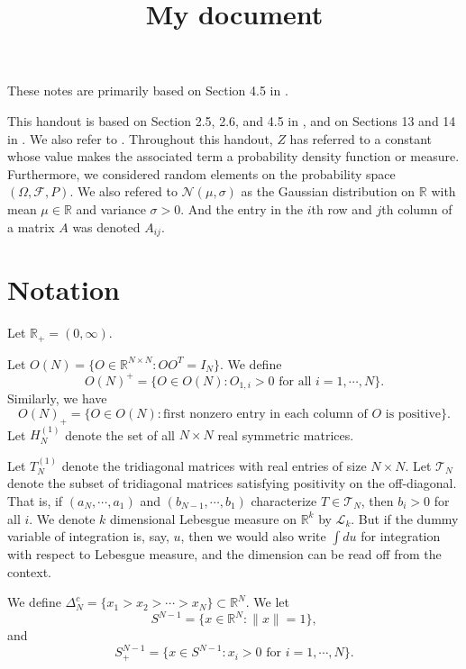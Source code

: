 \documentclass[
  twocolumn,
  landscape]{report}
\title{My document}
\author{}
\date{}
\theoremstyle{definition}
\theoremstyle{remark}
\newcommand{\R}{\mathbb{R}}
\renewcommand*\contentsname{Table of contents}
\newcommand\contentsname{Table of contents}
\begin{document}
\maketitle

\renewcommand*\contentsname{Table of contents}
{
\hypersetup{linkcolor=}
\setcounter{tocdepth}{2}
\tableofcontents
}
\listoffigures
\listoftables

These notes are primarily based on Section 4.5 in \cite{Anderson2010}.

This handout is based on Section 2.5, 2.6, and 4.5 in
\cite{Anderson2010}, and on Sections 13 and 14 in \cite{Kemp2022}. We
also refer to \cite{Dimitriu2018}. Throughout this handout, \(Z\) has
referred to a constant whose value makes the associated term a
probability density function or measure. Furthermore, we considered
random elements on the probability space \((\Omega, \mathcal{F}, P)\).
We also refered to \(\mathcal{N}(\mu, \sigma)\) as the Gaussian
distribution on \(\mathbb R\) with mean \(\mu \in \mathbb R\) and
variance \(\sigma > 0\). And the entry in the \(i\)th row and \(j\)th
column of a matrix \(A\) was denoted \(A_{ij}\).

\section{Notation}

Let \(\R_+ = (0,\infty)\).

Let \(O(N) = \{O \in \mathbb R^{N \times N}: OO^T = I_N \}\). We define
\[
O(N)^+ = \{ O \in O(N): O_{1,i} > 0 \text{ for all } i=1, \cdots, N \}.
\] Similarly, we have \[
O(N)_+ = \{ O \in O(N): \text{first nonzero entry in each column of $O$ is positive} \}.
\] Let \(H_N^{(1)}\) denote the set of all \(N \times N\) real symmetric
matrices.

Let \(T_N^{(1)}\) denote the tridiagonal matrices with real entries of
size \(N \times N\). Let \(\mathcal{T}_N\) denote the subset of
tridiagonal matrices satisfying positivity on the off-diagonal. That is,
if \((a_N, \cdots, a_1)\) and \((b_{N-1}, \cdots, b_1)\) characterize
\(T \in \mathcal{T}_N\), then \(b_i > 0\) for all \(i\). We denote \(k\)
dimensional Lebesgue measure on \(\R^{k}\) by \(\mathcal{L}_{k}\). But
if the dummy variable of integration is, say, \(u\), then we would also
write \(\int du\) for integration with respect to Lebesgue measure, and
the dimension can be read off from the context.

We define \(\Delta_N^c = \{x_1 > x_2 > \cdots > x_N\} \subset \R^N\). We
let \[S^{N-1} = \{ x \in \R^N: \lVert x \rVert = 1 \},\] and
\[S_+^{N-1} = \{ x \in S^{N-1}: x_i > 0 \text{ for } i = 1, \cdots, N\}.\]
\end{document}
